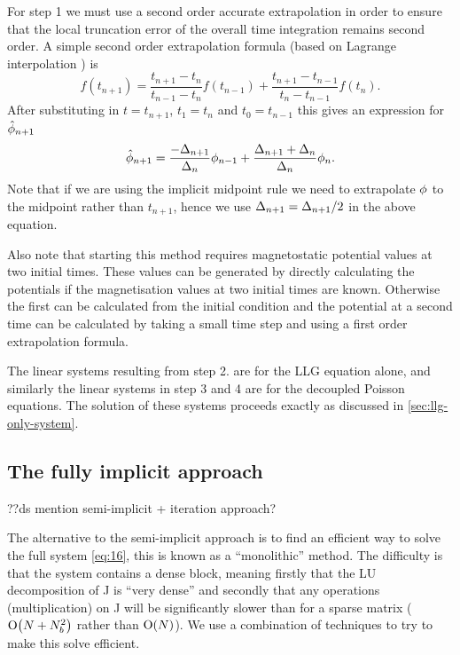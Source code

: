 For step 1 we must use a second order accurate extrapolation in order to ensure that the local truncation error of the overall time integration remains second order.
A simple second order extrapolation formula (based on Lagrange interpolation \cite[312]{Kincaid2002}) is 
\begin{equation}
  \label{eq:65}
  f(t_{n+1}) = \frac{t_{n+1} - t_n}{t_{n-1} - t_n}f(t_{n-1}) + \frac{t_{n+1} - t_{n-1}}{t_n - t_{n-1}}f(t_n).
\end{equation}
After substituting in $t=t_{n+1}$, $t_1=t_n$ and $t_0=t_{n-1}$ this gives an expression for $\hat{\phi}_{n+1}$
\begin{equation}
  \label{eq:66}
  \hat{\phi}_{n+1} = \frac{-\Delta_{n+1}}{\Delta_{n}} \phi_{n-1} + \frac{\Delta_{n+1} + \Delta_{n}}{\Delta_{n}} \phi_n.
\end{equation}
Note that if we are using the implicit midpoint rule we need to extrapolate $\phi$ to the midpoint rather than $t_{n+1}$, hence we use $\Delta_{n+1} = \Delta_{n+1} /2$ in the above equation.

Also note that starting this method requires magnetostatic potential values at two initial times. 
These values can be generated by directly calculating the potentials if the magnetisation values at two initial times are known.
Otherwise the first can be calculated from the initial condition and the potential at a second time can be calculated by taking a small time step and using a first order extrapolation formula.


The linear systems resulting from step 2. are for the LLG equation alone, and similarly the linear systems in step 3 and 4 are for the decoupled Poisson equations.
The solution of these systems proceeds exactly as discussed in \cref{sec:llg-only-system}.




\subsection{The fully implicit approach}
\label{sec:fully-implicit-bem}

??ds mention semi-implicit + iteration approach?

The alternative to the semi-implicit approach is to find an efficient way to solve the full system \cref{eq:16}, this is known as a ``monolithic'' method.
The difficulty is that the system contains a dense block, meaning firstly that the LU decomposition of J is ``very dense'' and secondly that any operations (\eg multiplication) on J will be significantly slower than for a sparse matrix ($\mathrm{O}{\left( N + N_b^2 \right)}$ rather than $\mathrm{O}{\left( N \right)}$).
We use a combination of techniques to try to make this solve efficient.

